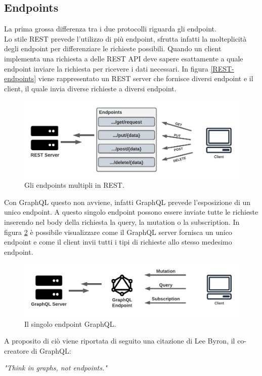 \subsection{Endpoints}
La prima grossa differenza tra i due protocolli riguarda gli endpoint.\\
Lo stile REST prevede l'utilizzo di più endpoint, sfrutta infatti la molteplicità degli endpoint per differenziare le richieste possibili. Quando un client implementa una richiesta a delle REST API deve sapere esattamente a quale endpoint inviare la richiesta per ricevere i dati necessari. In figura \ref{REST-endpoints} viene rappresentato un REST server che fornisce diversi endpoint e il client, il quale invia diverse richieste a diversi endpoint.
\FloatBarrier
\begin{figure}[!ht]
\centering
\includegraphics[width=1\linewidth]{immagini/RESTEndpoints.pdf}
\caption{Gli endpoints multipli in REST.}
\label{graphQL-usage-chart}
\end{figure}
\FloatBarrier
Con GraphQL questo non avviene, infatti GraphQL prevede l'esposizione di un unico endpoint. A questo singolo endpoint possono essere inviate tutte le richieste inserendo nel body della richiesta la query, la mutation o la subscription. In figura \ref{GraphQL-endpoint} è possibile visualizzare come il GraphQL server fornisca un unico endpoint e come il client invii tutti i tipi di richieste allo stesso medesimo endpoint.
\FloatBarrier
\begin{figure}[!ht]
\centering
\includegraphics[width=1\linewidth]{immagini/GraphQLEndpoint.pdf}
\caption{Il singolo endpoint GraphQL.}
\label{GraphQL-endpoint}
\end{figure}
\FloatBarrier
A proposito di ciò viene riportata di seguito una citazione di Lee Byron, il co-creatore di GraphQL:
\begin{quoting}
  \textit{"Think in graphs, not endpoints."}
\end{quoting}
